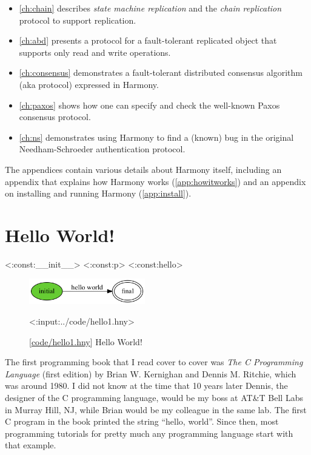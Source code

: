 \documentclass{report}
\newcommand{\harmonylink}[1]{%
[\href{https://harmony.cs.cornell.edu/#1}{\underline{#1}}]%
}
\newenvironment{code}{
\tcolorbox
}{
\endtcolorbox
}
\begin{document}
\begin{itemize}
\item \autoref{ch:chain} describes \emph{state machine replication} and
the \emph{chain replication} protocol to support replication.
\item \autoref{ch:abd} presents a protocol for a fault-tolerant
replicated object that supports only read and write operations.
\item \autoref{ch:consensus} demonstrates a fault-tolerant distributed consensus
algorithm (aka protocol) expressed in Harmony.
\item \autoref{ch:paxos} shows how one can specify and check the well-known
Paxos consensus protocol.
\item \autoref{ch:ns} demonstrates using Harmony to find a (known) bug in the original Needham-Schroeder authentication protocol.
\end{itemize}

The appendices contain various details about Harmony itself, including
an appendix that explains how Harmony works (\autoref{app:howitworks}) and
an appendix on installing and running Harmony (\autoref{app:install}).

\chapter{Hello World!}
\label{ch:harmonyintro}

<{:const:__init__}>
<{:const:p}>
<{:const:hello}>

\begin{figure}
\begin{center}
\includegraphics[width=0.45\textwidth]{figures/hello1.png}
\end{center}
\begin{code}
<{:input:../code/hello1.hny}>
\end{code}
\caption{\harmonylink{code/hello1.hny} Hello World!}
\label{fig:helloworld}
\end{figure}

The first programming book that I read cover to cover was \emph{The C Programming
Language} (first edition) by Brian W. Kernighan and Dennis M. Ritchie, which
was around 1980.  I did not know at the time that 10 years later Dennis,
the designer of the C programming language, would be my boss at AT\&T Bell Labs
in Murray Hill, NJ, while Brian would be my colleague in the same lab.
The first C program in the book printed
the string ``hello, world''.  Since then, most programming tutorials for
pretty much any programming language start with that example.
\end{document}
